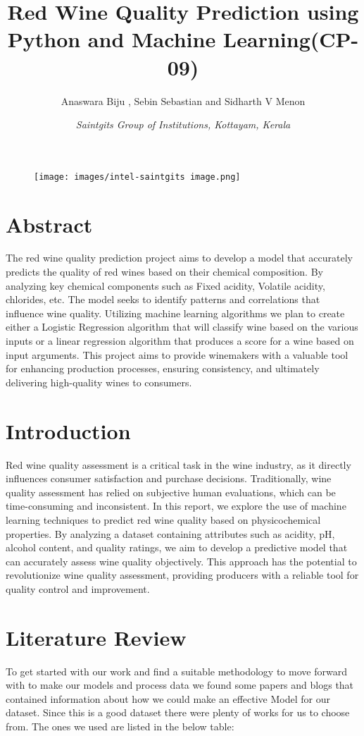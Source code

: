 \documentclass{article}
\title{\textbf{Red Wine Quality Prediction using Python and Machine Learning(CP-09)}}
\author{Anaswara Biju , Sebin Sebastian and Sidharth V Menon}
\date{\textit{Saintgits Group of Institutions, Kottayam, Kerala}}
\begin{document}
\begin{figure}[t]
\texttt{[image: images/intel-saintgits image.png]}

\end{figure}
\maketitle


\section{Abstract}
The red wine quality prediction project aims to develop a model that accurately predicts the quality of red wines based on their chemical composition. By analyzing key chemical components such as Fixed acidity, Volatile acidity, chlorides, etc. The model seeks to identify patterns and correlations that influence wine quality. Utilizing machine learning algorithms we plan to create either a Logistic Regression algorithm that will classify wine based on the various inputs or a linear regression algorithm that produces a score for a wine based on input arguments. This project aims to provide winemakers with a valuable tool for enhancing production processes, ensuring consistency, and ultimately delivering high-quality wines to consumers.

\section{Introduction}
Red wine quality assessment is a critical task in the wine industry, as it directly influences consumer satisfaction and purchase decisions. Traditionally, wine quality assessment has relied on subjective human evaluations, which can be time-consuming and inconsistent. In this report, we explore the use of machine learning techniques to predict red wine quality based on physicochemical properties. By analyzing a dataset containing attributes such as acidity, pH, alcohol content, and quality ratings, we aim to develop a predictive model that can accurately assess wine quality objectively. This approach has the potential to revolutionize wine quality assessment, providing producers with a reliable tool for quality control and improvement.
\section{Literature Review}
To get started with our work and find a suitable methodology to move forward with to make our models and process data we found some papers and blogs that contained information about how we could make an effective Model for our dataset.
Since this is a good dataset there were plenty of works for us to choose from. The ones we used are listed in the below table:
\end{document}

